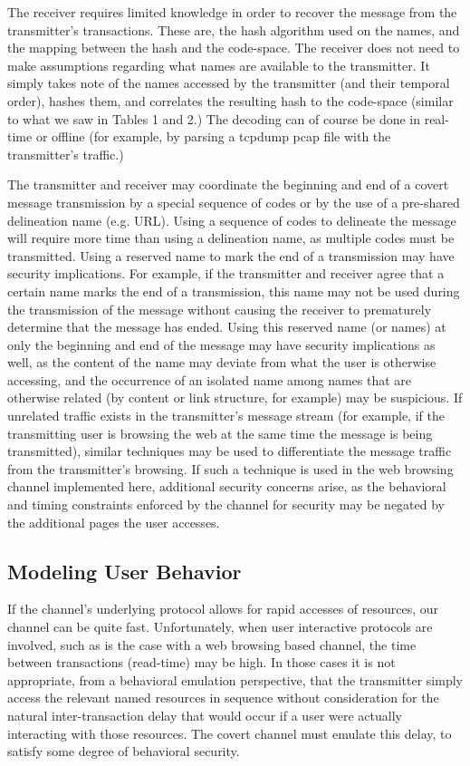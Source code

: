 \documentclass[10pt, conference]{IEEEtran}
\begin{document}
The receiver requires limited knowledge in order to recover the message from the transmitter's transactions.  These are, the hash algorithm used on the names, and the mapping between the hash and the code-space.  The receiver does not need to make assumptions regarding what names are available to the transmitter.  It simply takes note of the names accessed by the transmitter (and their temporal order), hashes them, and correlates the resulting hash to the code-space (similar to what we saw in Tables 1 and 2.)  The decoding can of course be done in real-time or offline (for example, by parsing a tcpdump pcap file with the transmitter's traffic.)

The transmitter and receiver may coordinate the beginning and end of a covert message transmission by a special sequence of codes or by the use of a pre-shared delineation name (e.g. URL).  Using a sequence of codes to delineate the message will require more time than using a delineation name, as multiple codes must be transmitted.  Using a reserved name to mark the end of a transmission may have security implications.  For example, if the transmitter and receiver agree that a certain name marks the end of a transmission, this name may not be used during the transmission of the message without causing the receiver to prematurely determine that the message has ended.  Using this reserved name (or names) at only the beginning and end of the message may have security implications as well, as the content of the name may deviate from what the user is otherwise accessing, and the occurrence of an isolated name among names that are otherwise related (by content or link structure, for example) may be suspicious.  If unrelated traffic exists in the transmitter's message stream (for example, if the transmitting user is browsing the web at the same time the message is being transmitted), similar techniques may be used to differentiate the message traffic from the transmitter's browsing.  If such a technique is used in the web browsing channel implemented here, additional security concerns arise, as the behavioral and timing constraints enforced by the channel for security may be negated by the additional pages the user accesses.

\subsection{Modeling User Behavior}
If the channel's underlying protocol allows for rapid accesses of resources, our channel can be quite fast.  Unfortunately, when user interactive protocols are involved, such as is the case with a web browsing based channel, the time between transactions (read-time) may be high.  In those cases it is not appropriate, from a behavioral emulation perspective, that the transmitter simply access the relevant named resources in sequence without consideration for the natural inter-transaction delay that would occur if a user were actually interacting with those resources.  The covert channel must emulate this delay, to satisfy some degree of behavioral security.
\end{document}
